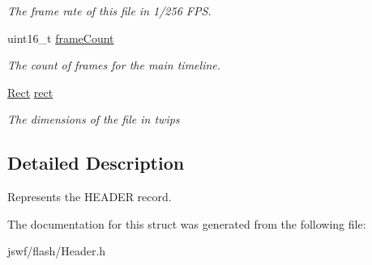 \begin{DoxyCompactItemize}
\begin{DoxyCompactList}\small\item\em The frame rate of this file in 1/256 F\+P\+S. \end{DoxyCompactList}\item 
\hypertarget{structjswf_1_1flash_1_1_header_ab687d679b8c9f543571913b98a0f6795}{uint16\+\_\+t \hyperlink{structjswf_1_1flash_1_1_header_ab687d679b8c9f543571913b98a0f6795}{frame\+Count}}\label{structjswf_1_1flash_1_1_header_ab687d679b8c9f543571913b98a0f6795}

\begin{DoxyCompactList}\small\item\em The count of frames for the main timeline. \end{DoxyCompactList}\item 
\hypertarget{structjswf_1_1flash_1_1_header_a458a074681b52632fe31faa33b760773}{\hyperlink{structjswf_1_1flash_1_1_rect}{Rect} \hyperlink{structjswf_1_1flash_1_1_header_a458a074681b52632fe31faa33b760773}{rect}}\label{structjswf_1_1flash_1_1_header_a458a074681b52632fe31faa33b760773}

\begin{DoxyCompactList}\small\item\em The dimensions of the file in {\ttfamily twips} \end{DoxyCompactList}\end{DoxyCompactItemize}


\subsection{Detailed Description}
Represents the {\ttfamily H\+E\+A\+D\+E\+R} record. 

The documentation for this struct was generated from the following file\+:\begin{DoxyCompactItemize}
\item 
jswf/flash/Header.\+h\end{DoxyCompactItemize}
